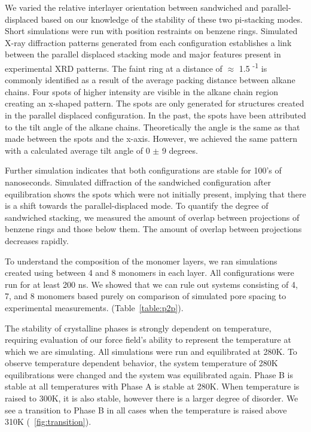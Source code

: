 We varied the relative interlayer orientation between sandwiched and 
parallel-displaced based on our knowledge of the stability of these two
pi-stacking modes. Short simulations were run with position restraints
on benzene rings. Simulated X-ray diffraction patterns generated from 
each configuration establishes a link between the parallel displaced 
stacking mode and major features present in experimental XRD patterns.  %
The faint ring at a distance of $\approx$ 1.5 \angstrom \textsuperscript{-1} 
is commonly identified as a result of the average packing distance 
between alkane chains. Four spots of higher intensity are visible in the 
alkane chain region creating an x-shaped pattern. The spots are only
generated for structures created in the parallel displaced configuration.
In the past, the spots have been attributed to the tilt angle of the 
alkane chains. Theoretically the angle is the same as that made between 
the spots and the x-axis. However, we achieved the same pattern with 
a calculated average tilt angle of 0 $\pm$ 9 degrees. %

Further simulation indicates that both configurations are stable for 
100's of nanoseconds. Simulated diffraction of the sandwiched 
configuration after equilibration shows the spots which were not initially
present, implying that there is a shift towards the parallel-displaced
mode. To quantify the degree of sandwiched stacking, we measured the 
amount of overlap between projections of benzene rings and those below
them. The amount of overlap between projections decreases rapidly. %
	
To understand the composition of the monomer layers, we ran simulations
created using between 4 and 8 monomers in each layer. All configurations 
were run for at least 200 ns. We showed that we can rule out systems 
consisting of 4, 7, and 8 monomers based purely on comparison of 
simulated pore spacing to experimental measurements.
(Table~\ref{table:p2p}). 
        
The stability of crystalline phases is strongly dependent on temperature,
requiring evaluation of our force field's ability to represent the 
temperature at which we are simulating. All simulations were run and 
equilibrated at 280K. To observe temperature dependent behavior, 
the system temperature of 280K equilibrations were changed and the system
was equilibrated again. Phase B is stable at all temperatures with 
Phase A is stable at 280K. When temperature is raised to 300K, it is also
stable, however there is a larger degree of disorder. We see a transition
to Phase B in all cases when the temperature is raised above 310K 
(~\ref{fig:transition}). 

